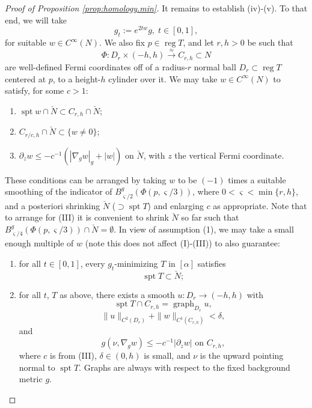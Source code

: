 \documentclass[11pt, letterpaper, reqno]{amsart}
\numberwithin{equation}{section}
\theoremstyle{remark}
\newcommand{\spt}{\operatorname{spt}}
\newcommand{\graph}{\operatorname{graph}}
\newcommand{\reg}{\operatorname{reg}}
\begin{document}
\begin{proof}[Proof of Proposition \ref{prop:homology.min}]
	It remains to establish (iv)-(v). To that end, we will take
		\[ g_t := e^{2tw} g, \; t \in [0,1], \]
		for suitable $w \in C^\infty(N)$. We also fix $p \in \reg T$, and let $r, h > 0$ be such that
		\[ \Phi : D_{r} \times (-h, h) \stackrel{\approx}{\to} C_{r,h} \subset N \]
		are well-defined Fermi coordinates off of a radius-$r$ normal ball $D_{r} \subset \reg T$ centered at $p$, to a height-$h$ cylinder over it. We may take $w \in C^\infty(N)$ to satisfy, for some $c > 1$:
		\begin{enumerate}
			\item[(I)] $\spt w \cap \breve N \subset C_{r,h} \cap \breve N$;
			\item[(II)] $C_{r/c,h} \cap \breve N \subset \{ w \neq 0 \}$;
			\item[(III)] $\partial_z w \leq -c^{-1}(|\nabla_g w|_g + |w|)$ on $\breve N$, with $z$ the vertical Fermi coordinate.
		\end{enumerate}
		These conditions can be arranged by taking $w$ to be $(-1)$ times a suitable smoothing of the indicator of $B^g_{\varsigma/2}(\Phi(p, \varsigma/3))$, where $0 < \varsigma < \min\{r,h\}$, and a posteriori shrinking $\breve N$ ($\supset \spt T$) and enlarging $c$ as appropriate. Note that to arrange for (III) it is convenient to shrink $\breve N$ so far such that $B^g_{\varsigma/4}(\Phi(p, \varsigma/3)) \cap \breve N = \emptyset$. In view of assumption (1), we may take a small enough multiple of $w$ (note this does not affect (I)-(III)) to also guarantee:
		\begin{enumerate}
			\item[(IV)] for all $t \in [0,1]$, every $g_t$-minimizing $T$ in $[\alpha]$ satisfies
				\[ \spt T \subset \breve N; \]
			\item[(V)] for all $t$, $T$ as above, there exists a smooth $u : D_r \to (-h, h)$ with
				\[ \spt T \cap C_{r,h} = \graph_{D_r} u, \]
				\[ \|u\|_{C^2(D_r)} + \|w\|_{C^1(C_{r, h})} < \delta, \]
				and
				\begin{equation} \label{eq:homology.min.graph.grad}
					g(\nu, \nabla_g w) \leq - c^{-1} |\partial_z w| \text{ on } C_{r,h},
				\end{equation}
				where $c$ is from (III), $\delta \in (0, h)$ is small, and $\nu$ is the upward pointing normal to $\spt T$. Graphs are always with respect to the fixed background metric $g$.  
		\end{enumerate}
	

\end{proof}
\end{document}

